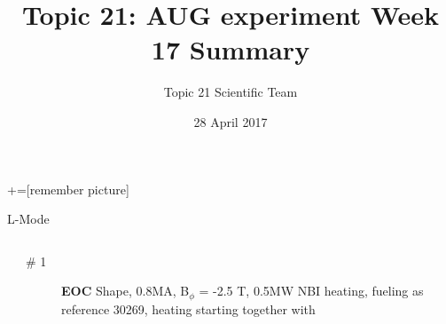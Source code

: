 \documentclass[10pt, compress]{beamer}
\title{Topic 21: AUG experiment Week 17 Summary}
\date{28 April 2017}
\author[Topic 21 Scientific Team]{Topic 21 Scientific Team}
\newcommand\Fontvi{\fontsize{8}{7.2}\selectfont}
\begin{document}
+=[remember picture]
\maketitle

\begin{frame}{L-Mode}
\Fontvi
  \vspace{-1cm}
\begin{columns}
  \begin{column}{0.5\textwidth}
  \end{column}
  \begin{column}{0.5\textwidth}
    \begin{description}
      \item[\# 1] \textbf{EOC} Shape, 0.8MA, B$_{\phi}$ = -2.5 T, 0.5MW NBI heating,
        fueling as reference 30269, heating starting together with

\end{description}
\end{column}
\end{columns}
\end{frame}
\end{document}
